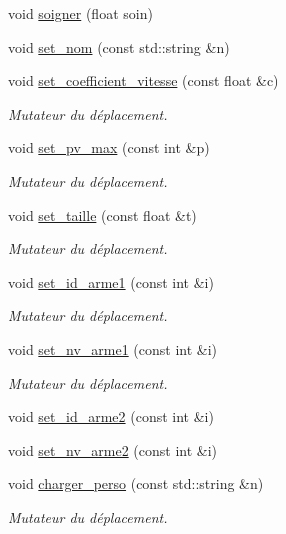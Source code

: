 \begin{DoxyCompactItemize}
\item 
void \hyperlink{classPerso_a26cb7f4235726561a55d6feb585cf789}{soigner} (float soin)
\item 
void \hyperlink{classPerso_a072d564a8bca3b10d03acbffc9dacfea}{set\+\_\+nom} (const std\+::string \&n)
\item 
void \hyperlink{classPerso_aa687e5caeb62f90622ad1a09e4e95380}{set\+\_\+coefficient\+\_\+vitesse} (const float \&c)
\begin{DoxyCompactList}\small\item\em Mutateur du déplacement. \end{DoxyCompactList}\item 
void \hyperlink{classPerso_a197f7c4a5ca9677ebc597a56b64d066c}{set\+\_\+pv\+\_\+max} (const int \&p)
\begin{DoxyCompactList}\small\item\em Mutateur du déplacement. \end{DoxyCompactList}\item 
void \hyperlink{classPerso_aba25d0e7ca796d4b5f05b9a4ff34d239}{set\+\_\+taille} (const float \&t)
\begin{DoxyCompactList}\small\item\em Mutateur du déplacement. \end{DoxyCompactList}\item 
void \hyperlink{classPerso_ac6538c0cccd1f7703fabadf491737a41}{set\+\_\+id\+\_\+arme1} (const int \&i)
\begin{DoxyCompactList}\small\item\em Mutateur du déplacement. \end{DoxyCompactList}\item 
void \hyperlink{classPerso_a4f35ce41db777a555946a52609a48ee3}{set\+\_\+nv\+\_\+arme1} (const int \&i)
\begin{DoxyCompactList}\small\item\em Mutateur du déplacement. \end{DoxyCompactList}\item 
void \hyperlink{classPerso_a04d4fcb6ad182eb25914abf047775a82}{set\+\_\+id\+\_\+arme2} (const int \&i)
\item 
void \hyperlink{classPerso_a9c2da2ddd242e58d3316e89e2c1d952f}{set\+\_\+nv\+\_\+arme2} (const int \&i)
\item 
void \hyperlink{classPerso_a12d61850ed6d9e1ce8da1b95a976e5cb}{charger\+\_\+perso} (const std\+::string \&n)
\begin{DoxyCompactList}\small\item\em Mutateur du déplacement. \end{DoxyCompactList}\item 

\end{DoxyCompactItemize}
